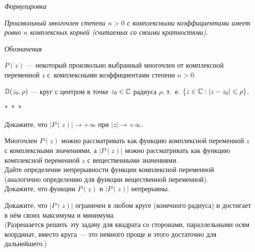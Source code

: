 \documentclass[a4paper, 12pt]{article}
\newcommand{\0}[1]{\overline{#1}}
\def\C{\mbox{$\Bbb C$}}
\begin{document}




\centerline{\sl Формулировка}

\vspace{3pt}

{\it
Произвольный многочлен степени $n>0$ с комплексными коэффициентами имеет
ровно $n$ комплексных корней (считаемых со своими кратностями).}

\rm

\vspace{7pt}

\centerline{\sl Обозначения}

\vspace{3pt}

\noindent
$P(z)$ --- некоторый произвольно выбранный многочлен от комплексной
переменной $z$ с~комплексными коэффициентами степени $n>0$.

\noindent
${\Bbb D}(z_0,\rho)$ --- круг с центром в точке $z_0\in\C$ радиуса $\rho$,
т.~е. $\{z\in\C:|z-z_0|\le\rho\}$.

\vspace{7pt}

\centerline{*~*~*}

\vspace{3pt}

 Докажите, что
$|P(z)|\rightarrow+\infty$ при $|z|\rightarrow+\infty$.

Многочлен $P(z)$ можно рассматривать как функцию комплексной переменной
$z$ с комплексными значениями, а $|P(z)|$
можно рассматривать как функцию комплексной переменной
$z$ с вещественными значениями.\\
Дайте определение непрерывности функции комплексной переменной
(аналогично определению для функции вещественной переменной).\\
Докажите, что функции $P(z)$ и $|P(z)|$ непрерывны.

Докажите, что
$|P(z)|$ ограничен в любом круге (конечного радиуса) и достигает в н\"ем
своих максимума и минимума.\\
{\small (Разрешается решить эту задачу для квадрата со сторонами,
параллельными осям координат, вместо круга --- это немного проще и этого достаточно
для дальнейшего.)}

\end{document}
